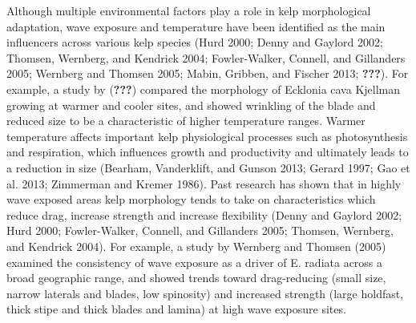 \documentclass[
  a4paper,
]{article}
\begin{document}
Although multiple environmental factors play a role in kelp
morphological adaptation, wave exposure and temperature have been
identified as the main influencers across various kelp species (Hurd
2000; Denny and Gaylord 2002; Thomsen, Wernberg, and Kendrick 2004;
Fowler-Walker, Connell, and Gillanders 2005; Wernberg and Thomsen 2005;
Mabin, Gribben, and Fischer 2013; {\textbf{???}}). For example, a study
by ({\textbf{???}}) compared the morphology of Ecklonia cava Kjellman
growing at warmer and cooler sites, and showed wrinkling of the blade
and reduced size to be a characteristic of higher temperature ranges.
Warmer temperature affects important kelp physiological processes such
as photosynthesis and respiration, which influences growth and
productivity and ultimately leads to a reduction in size (Bearham,
Vanderklift, and Gunson 2013; Gerard 1997; Gao et al. 2013; Zimmerman
and Kremer 1986). Past research has shown that in highly wave exposed
areas kelp morphology tends to take on characteristics which reduce
drag, increase strength and increase flexibility (Denny and Gaylord
2002; Hurd 2000; Fowler-Walker, Connell, and Gillanders 2005; Thomsen,
Wernberg, and Kendrick 2004). For example, a study by Wernberg and
Thomsen (2005) examined the consistency of wave exposure as a driver of
E. radiata across a broad geographic range, and showed trends toward
drag-reducing (small size, narrow laterals and blades, low spinosity)
and increased strength (large holdfast, thick stipe and thick blades and
lamina) at high wave exposure sites.
\end{document}
